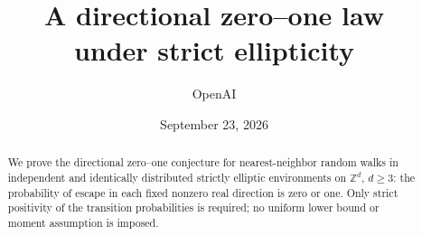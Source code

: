 \documentclass[11pt,a4paper]{article}
\title{A directional zero--one law\protect\\ under strict ellipticity}
\author{OpenAI}
\date{September 23, 2026}
\newcommand{\ZZ}{\mathbb Z}
\newcommand{\1}{\mathbf 1}
\theoremstyle{definition}
\theoremstyle{remark}
\begin{document}
\maketitle
\begin{abstract}
We prove the directional zero--one conjecture for nearest-neighbor random
walks in independent and identically distributed strictly elliptic environments
on $\ZZ^d$, $d\ge3$: the probability of escape in each fixed nonzero real
direction is zero or one. Only strict positivity of the transition probabilities
is required; no uniform lower bound or moment assumption is imposed.
\end{abstract}
{\small
\tableofcontents
\par}









\end{document}

